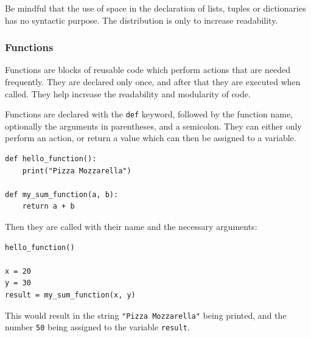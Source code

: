 \documentclass[a4paper,12pt]{article}
\begin{document}
Be mindful that the use of space in the declaration of lists, tuples or dictionaries has no syntactic purpose. The distribution is only to increase readability.

\subsubsection{Functions}

Functions are blocks of reusable code which perform actions that are needed frequently. They are declared only once, and after that they are executed when called. They help increase the readability and modularity of code.

Functions are declared with the \verb|def| keyword, followed by the function name, optionally the  arguments in parentheses, and a semicolon. They can either only perform an action, or return a value which can then be assigned to a variable.

\begin{tcolorbox}[
    enhanced,
    attach boxed title to top left={xshift=6mm,yshift=-3mm},
    colback=lightgreen!20,
    colframe=lightgreen,
    colbacktitle=lightgreen,
    title=Python,
    fonttitle=\bfseries\color{black},
    boxed title style={size=small,colframe=lightgreen,sharp corners},
    sharp corners,
    ]
    \begin{verbatim}
def hello_function():
    print("Pizza Mozzarella")

def my_sum_function(a, b):
    return a + b
    \end{verbatim}
\end{tcolorbox}

Then they are called with their name and the necessary arguments:

\begin{tcolorbox}[
    enhanced,
    attach boxed title to top left={xshift=6mm,yshift=-3mm},
    colback=lightgreen!20,
    colframe=lightgreen,
    colbacktitle=lightgreen,
    title=Python,
    fonttitle=\bfseries\color{black},
    boxed title style={size=small,colframe=lightgreen,sharp corners},
    sharp corners,
    ]
    \begin{verbatim}
hello_function()

x = 20
y = 30
result = my_sum_function(x, y)
    \end{verbatim}
\end{tcolorbox}

This would result in the string \verb|"Pizza Mozzarella"| being printed, and the number \verb|50| being assigned to the variable \verb|result|.
\end{document}
